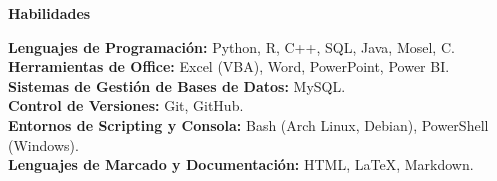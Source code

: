 \documentclass[8pt]{extarticle} %
\begin{document}
\begin{center}  
    \vspace{1ex}  
    \textbf{Habilidades} 
    \vspace{-1ex}  
\end{center}

\textbf{Lenguajes de Programación:} Python, R, C++, SQL, Java, Mosel, C.\\  
\textbf{Herramientas de Office:} Excel (VBA), Word, PowerPoint, Power BI.\\  
\textbf{Sistemas de Gestión de Bases de Datos:} MySQL.\\  
\textbf{Control de Versiones:} Git, GitHub.\\  
\textbf{Entornos de Scripting y Consola:} Bash (Arch Linux, Debian), PowerShell (Windows).\\
\textbf{Lenguajes de Marcado y Documentación:} HTML, LaTeX, Markdown.\\
\end{document}
